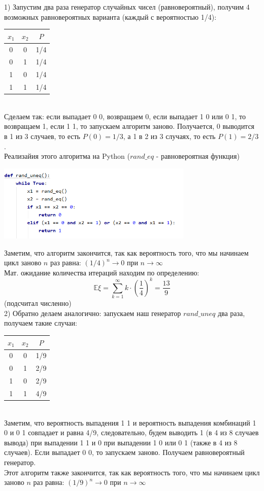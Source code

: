 \documentclass[a4paper,12pt]{article} %
\begin{document}
1) Запустим два раза генератор случайных чисел (равновероятный), получим 4 возможных равновероятных варианта (каждый с вероятностью 1/4):\\
\begin{tabular}{|c|c|c|}
\hline 
$x_1$ & $x_2$ & $P$ \\ 
\hline 
0 & 0 & 1/4 \\ 
\hline 
0 & 1 & 1/4 \\ 
\hline 
1 & 0 & 1/4 \\ 
\hline 
1 & 1 & 1/4 \\ 
\hline 
\end{tabular} 
\smallskip \\
Сделаем так: если выпадает 0 0, возвращаем 0, если выпадает 1 0 или 0 1, то возвращаем 1, если 1 1, то запускаем алгоритм заново. Получается, 0 выводится в 1 из 3 случаев, то есть $ P(0)=1/3 $, а 1 в 2 из 3 случаях, то есть $ P(1) = 2/3 $.\\
Реализайия этого алгоритма на Python ($rand\_eq$ - равновероятная функция)
\begin{center}
\includegraphics[width=0.7\textwidth]{code}
\end{center} 

Заметим, что алгоритм закончится, так как вероятность того, что мы начинаем цикл заново $ n $ раз равна: $ (1/4)^n \rightarrow 0 $ при $n\rightarrow \infty$\\

Мат. ожидание количества итераций находим по определению:
$$
\mathbb{E}\xi = \sum\limits_{k=1}^{\infty} k \cdot \left(\frac{1}{4}\right)^k = \frac{13}{9}
$$
(подсчитал численно)\\

2) Обратно делаем аналогично: запускаем наш генератор $rand\_uneq$ два раза, получаем такие случаи:
\begin{tabular}{|c|c|c|}
\hline 
$x_1$ & $x_2$ & $P$ \\ 
\hline 
0 & 0 & 1/9 \\ 
\hline 
0 & 1 & 2/9 \\ 
\hline 
1 & 0 & 2/9 \\ 
\hline 
1 & 1 & 4/9 \\ 
\hline 
\end{tabular} 
\smallskip \\
Заметим, что вероятность выпадения 1 1 и вероятность выпадения комбинаций 1 0 и 0 1 совпадает и равна 4/9, следовательно, будем выводить 1 (в 4 из 8 случаев вывода) при выпадении 1 1 и 0 при выпадении 1 0 или 0 1 (также в 4 из 8 случаев). Если выпадает 0 0, то запускаем заново. Получаем равновероятный генератор.\\
Этот алгоритм также закончится, так как вероятность того, что мы начинаем цикл заново $ n $ раз равна: $ (1/9)^n \rightarrow 0 $ при $n\rightarrow \infty$\\
\end{document}
